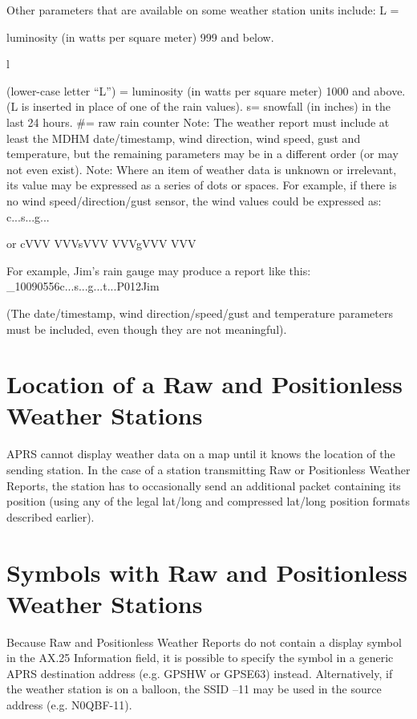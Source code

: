 Other parameters that are available on some weather station units include:
L =

luminosity (in watts per square meter) 999 and below.

l

(lower-case letter “L”) = luminosity (in watts per square meter)
1000 and above.
(L is inserted in place of one of the rain values).
s=
snowfall (in inches) in the last 24 hours.
#=
raw rain counter
Note: The weather report must include at least the MDHM date/timestamp,
wind direction, wind speed, gust and temperature, but the remaining
parameters may be in a different order (or may not even exist).
Note: Where an item of weather data is unknown or irrelevant, its value may
be expressed as a series of dots or spaces. For example, if there is no wind
speed/direction/gust sensor, the wind values could be expressed as:
c...s...g...

or cVVV
VVVsVVV
VVVgVVV
VVV

For example, Jim’s rain gauge may produce a report like this:
_10090556c...s...g...t...P012Jim

(The date/timestamp, wind direction/speed/gust and temperature parameters
must be included, even though they are not meaningful).


\section{Location of a Raw and Positionless Weather Stations}

APRS cannot display weather data on a map until it knows the location of the
sending station. In the case of a station transmitting Raw or Positionless
Weather Reports, the station has to occasionally send an additional packet
containing its position (using any of the legal lat/long and compressed
lat/long position formats described earlier).

\section {Symbols with Raw and Positionless Weather Stations}

Because Raw and Positionless Weather Reports do not contain a display
symbol in the AX.25 Information field, it is possible to specify the symbol in
a generic APRS destination address (e.g. GPSHW or GPSE63) instead.
Alternatively, if the weather station is on a balloon, the SSID –11 may be
used in the source address (e.g. N0QBF-11).

